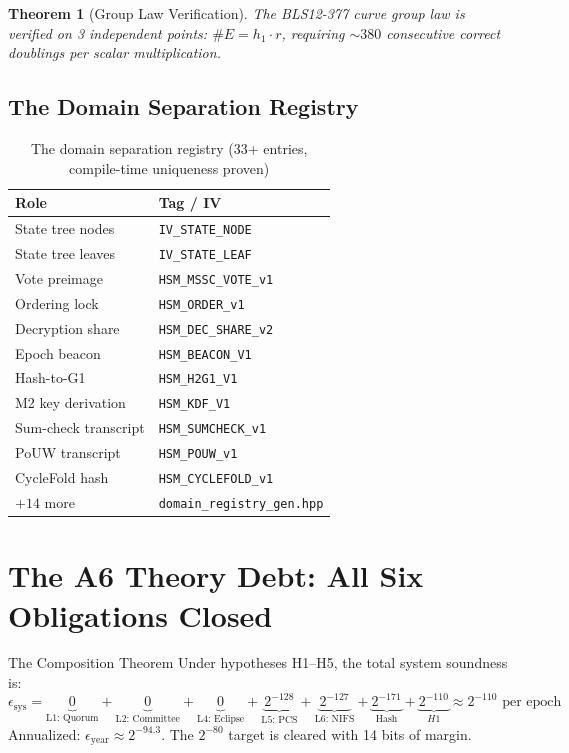 \documentclass[11pt, a4paper]{article}
\newtheorem{theorem}{Theorem}
\begin{document}
\begin{theorem}[Group Law Verification]
The BLS12-377 curve group law is verified on 3 independent points:
 $\#E = h_1 \cdot r$, requiring $\sim 380$ consecutive correct
doublings per scalar multiplication.
\end{theorem}

\subsection{The Domain Separation Registry}

\begin{table}[h]
\centering
{}
\begin{tabular}{l|l}
\rowcolor{hsmaBlue!20} \textbf{Role} & \textbf{Tag / IV} \\
\hline
State tree nodes & \texttt{IV\_STATE\_NODE} \\
State tree leaves & \texttt{IV\_STATE\_LEAF} \\
Vote preimage & \texttt{HSM\_MSSC\_VOTE\_v1} \\
Ordering lock & \texttt{HSM\_ORDER\_v1} \\
Decryption share & \texttt{HSM\_DEC\_SHARE\_v2} \\
Epoch beacon & \texttt{HSM\_BEACON\_V1} \\
Hash-to-G1 & \texttt{HSM\_H2G1\_V1} \\
M2 key derivation & \texttt{HSM\_KDF\_V1} \\
Sum-check transcript & \texttt{HSM\_SUMCHECK\_v1} \\
PoUW transcript & \texttt{HSM\_POUW\_v1} \\
CycleFold hash & \texttt{HSM\_CYCLEFOLD\_v1} \\
 $+14$ more & \texttt{domain\_registry\_gen.hpp} \\
\bottomrule
\end{tabular}
\caption{The domain separation registry (33+ entries, compile-time uniqueness proven)}
\end{table}

\section{The A6 Theory Debt: All Six Obligations Closed}
\label{sec:a6}

\begin{keybox}{The Composition Theorem}
Under hypotheses H1--H5, the total system soundness is:
\begin{equation}
\epsilon_{\text{sys}} =
\underbrace{0}_{\text{L1: Quorum}} +
\underbrace{0}_{\text{L2: Committee}} +
\underbrace{0}_{\text{L4: Eclipse}} +
\underbrace{2^{-128}}_{\text{L5: PCS}} +
\underbrace{2^{-127}}_{\text{L6: NIFS}} +
\underbrace{2^{-171}}_{\text{Hash}} +
\underbrace{2^{-110}}_{H1}
\approx 2^{-110} \text{ per epoch}
\end{equation}
Annualized: $\epsilon_{\text{year}} \approx 2^{-94.3}$.
The $2^{-80}$ target is cleared with 14 bits of margin.
\end{keybox}
\end{document}
